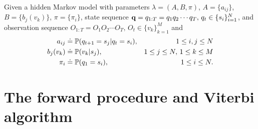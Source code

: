 Given a hidden Markov model with parameters $\lambda = (A, B, \pi)$,
$A = \{a_{ij}\}$, $B = \{b_j(v_k)\}$, $\pi = \{\pi_i\}$, 
state sequence $\mathbf{q} = q_{1:T} = q_1 q_2 \cdots q_T, \, q_t \in \{s_i\}_{i=1}^N$,
and observation sequence $O_{1:T} = O_1 O_2 \cdots O_T, \, O_t \in \{v_k\}_{k=1}^M$ and
\begin{equation}
\label{eq:notebasic}
\begin{aligned}
a_{ij}   & \doteq \mathbb{P}(q_{t+1} = s_j |q_{t} = s_i), & 1 \le i,j \le N \\
b_j(v_k) & \doteq \mathbb{P}(v_k |s_j),                   & 1 \le j \le N, \, 1 \le k \le M   \\
\pi_i    & \doteq \mathbb{P}(q_1 = s_i),                  & 1 \le i \le N.
\end{aligned}
\end{equation}


\section{The forward procedure and Viterbi algorithm}
\label{sec:forward}

